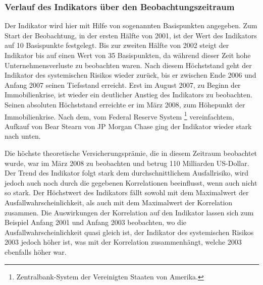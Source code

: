 \documentclass[a4paper,12pt]{scrartcl}
\begin{document}
\subsubsection{Verlauf des Indikators über den Beobachtungszeitraum}
Der Indikator wird hier mit Hilfe von sogenannten Basispunkten angegeben. Zum Start der Beobachtung, in der ersten Hälfte von 2001, ist der Wert des Indikators auf 10 Basispunkte festgelegt. Bis zur zweiten Hälfte von 2002 steigt der Indikator bis auf einen Wert von 35 Basispunkten, da während dieser Zeit hohe Unternehmensverluste zu beobachten waren. Nach diesem Höchststand geht der Indikator des systemischen Risikos wieder zurück, bis er zwischen Ende 2006 und Anfang 2007 seinen Tiefsstand erreicht. Erst im August 2007, zu Beginn der Immobilienkrise, ist wieder ein deutlicher Anstieg des Indikators zu beobachten. Seinen absoluten Höchststand erreichte er im März 2008, zum Höhepunkt der Immobilienkrise. Nach dem, vom Federal Reserve System \footnote{Zentralbank-System der Vereinigten Staaten von Amerika.} vereinfachtem, Aufkauf von Bear Stearn von JP Morgan Chase ging der Indikator wieder stark nach unten.

Die höchste theoretische Versicherungsprämie, die in diesem Zeitraum beobachtet wurde, war im März 2008 zu beobachten und betrug 110 Milliarden US-Dollar.
Der Trend des Indikator folgt stark dem durchschnittlichem Ausfallrisiko, wird jedoch auch noch durch die gegebenen Korrelationen beeinflusst, wenn auch nicht so stark. Der Höchstwert des Indikators fällt sowohl mit dem Maximalwert der Ausfallwahrscheinlichkeit, als auch mit dem Maximalwert der Korrelation zusammen.
Die Auswirkungen der Korrelation auf den Indikator lassen sich zum Beispiel Anfang 2001 und Anfang 2003 beobachten, wo die Ausfallwahrscheinlichkeit quasi gleich ist, der Indikator des systemischen Risikos 2003 jedoch höher ist, was mit der Korrelation zusammenhängt, welche 2003 ebenfalls höher war.
\end{document}
